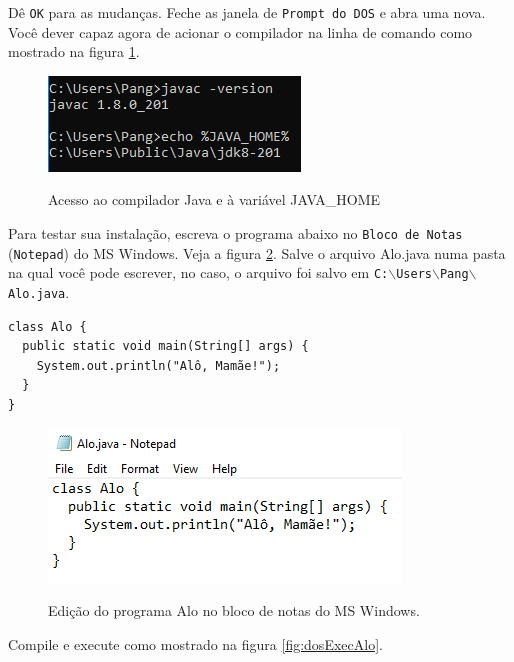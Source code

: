 \documentclass[
	12pt,				%
	twoside,			%
	a4paper,			%
	english,			%
	french,				%
	spanish,			%
	brazil				%
	]{abntex2}
\begin{document}
Dê \texttt{OK} para as mudanças. Feche as janela de \texttt{Prompt do DOS} e abra uma nova. Você dever capaz agora de acionar o compilador na linha de comando como mostrado na figura \ref{test-vars}.

\begin{figure}[h]
\begin{center}
\includegraphics[scale=0.5]{test-vars.png} 
\caption{Acesso ao compilador Java e à variável JAVA\_HOME}
\label{test-vars}
\end{center}
\end{figure}

Para testar sua instalação, escreva o programa abaixo no \texttt{Bloco de Notas} (\texttt{Notepad}) do MS Windows. Veja a figura \ref{fig:notepad}. Salve o arquivo Alo.java numa pasta na qual você pode escrever, no caso, o arquivo foi salvo em \texttt{C:$\backslash$Users$\backslash$Pang$\backslash$Alo.java}.
\label{prog:Alo1}
\begin{verbatim}
class Alo {
  public static void main(String[] args) {
    System.out.println("Alô, Mamãe!");
  }
}
\end{verbatim}

\begin{figure}[h]
\begin{center}
\includegraphics[scale=0.4]{notepadAlo.png} 
\caption{Edição do programa Alo no bloco de notas do MS Windows.}
\label{fig:notepad}
\end{center}
\end{figure}

Compile e execute como mostrado na figura \ref{fig:dosExecAlo}.
\end{document}

